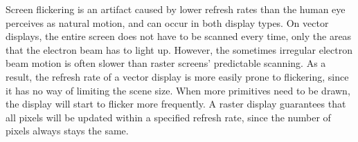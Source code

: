 Screen flickering is an artifact caused by lower refresh rates than the human eye perceives as natural motion, and can occur in both display types. \cite{flicker}
On vector displays, the entire screen does not have to be scanned every time, only the areas that the electron beam has to light up.
However, the sometimes irregular electron beam motion is often slower than raster screens' predictable scanning\cite{vecvsras}.
As a result, the refresh rate of a vector display is more easily prone to flickering, since it has no way of limiting the scene size.
When more primitives need to be drawn, the display will start to flicker more frequently.
A raster display guarantees that all pixels will be updated within a specified refresh rate, since the number of pixels always stays the same.
